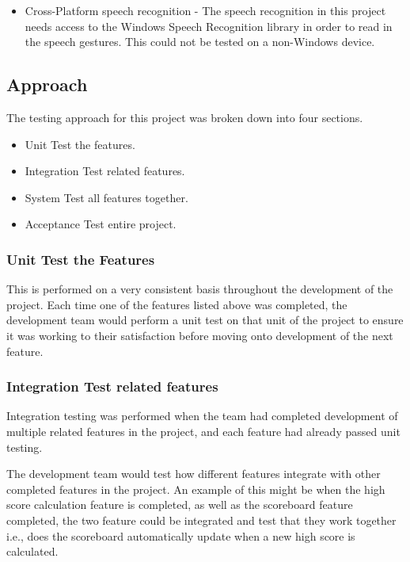 \documentclass{article}
\begin{document}
\begin{itemize}
  \item Cross-Platform speech recognition - The speech recognition in this project needs access to the Windows Speech Recognition library in order to read in the speech gestures. This could not be tested on a non-Windows device.
\end{itemize}

\subsection{Approach}
The testing approach for this project was broken down into four sections.

\begin{itemize}
  \item Unit Test the features.
  \item Integration Test related features.
  \item System Test all features together.
  \item Acceptance Test entire project.
\end{itemize}

\subsubsection{Unit Test the Features}
This is performed on a very consistent basis throughout the development of the project. Each time one of the features listed above was completed, the development team would perform a unit test on that unit of the project to ensure it was working to their satisfaction before moving onto development of the next feature.

\subsubsection{Integration Test related features}
Integration testing was performed when the team had completed development of multiple related features in the project, and each feature had already passed unit testing. 
\bigskip

The development team would test how different features integrate with other completed features in the project. An example of this might be when the high score calculation feature is completed, as well as the scoreboard feature completed, the two feature could be integrated and test that they work together i.e., does the scoreboard automatically update when a new high score is calculated. 
\end{document}
